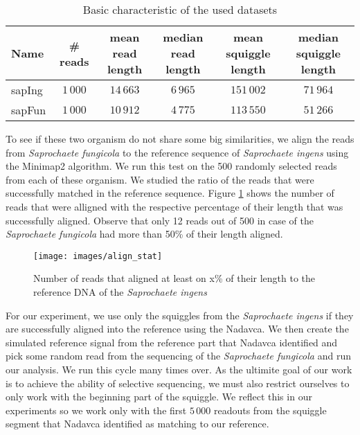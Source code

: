 \begin{table}
\caption[TODO]{Basic characteristic of the used datasets}
\label{tab:datasetChar}
\begin{center}
\begin{tabular}{lccccc}
\hline 
Name & \# reads & \specialcell{mean read\\length} & \specialcell{median read\\length} & \specialcell{mean squiggle\\length} &  \specialcell{median squiggle\\length}\\
\hline
sapIng & $1\,000$ & $14\,663$ & $6\,965$ & $151\,002$ & $71\,964$ \\
sapFun & $1\,000$ & $10\,912$ & $4\,775$ & $113\,550$ & $51\,266$ \\
\hline
\end{tabular}
\end{center}
\end{table}

To see if these two organism do not share some big similarities, we align the reads from
\emph{Saprochaete fungicola} to the reference sequence of \emph{Saprochaete ingens} using the Minimap2
algorithm. We run this test on the 500 randomly selected reads from each of these organism. We studied
the ratio of the reads that were successfully matched in the reference sequence. Figure \ref{obr:align_stat}
shows the number of reads that were alligned with the respective percentage of their length that was successfully aligned.
Observe that only 12 reads out of 500 in case of the \emph{Saprochaete fungicola} had more than 50\% of their length aligned.

\begin{figure}
\centerline{\texttt{[image: images/align\_stat]}}
\caption[TODO]{Number of reads that aligned at least on x\% of their length to the reference DNA of the \emph{Saprochaete ingens}}
\label{obr:align_stat}
\end{figure}

For our experiment, we use only the squiggles from the \emph{Saprochaete ingens} if they
are successfully aligned into the reference using the Nadavca. We then create the
simulated reference signal from the reference part that Nadavca identified and pick
some random read from the sequencing of the \emph{Saprochaete fungicola} and run our analysis.
We run this cycle many times over. As the ultimite goal of our work is to achieve
the ability of selective sequencing, we must also restrict ourselves to only work with
the beginning part of the squiggle. We reflect this in our experiments so we
work only with the first $5\,000$ readouts from the squiggle segment that Nadavca identified
as matching to our reference.

